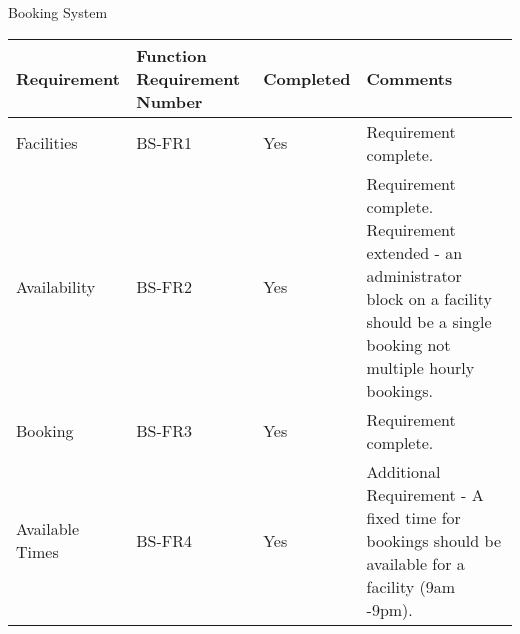 Booking System \\
\begin{center}
\begin{tabular}{ |l|l|l|l| }
\hline

Requirement &  Function Requirement Number 	& Completed 	& Comments	 \\
\hline
Facilities      									& BS-FR1	& Yes      		& Requirement complete. \\
Availability   										& BS-FR2	& Yes      		& Requirement complete. Requirement extended - an administrator block on a facility should be a single booking not multiple hourly bookings. 	\\
Booking         									& BS-FR3	& Yes      		& Requirement complete. \\
Available Times 									& BS-FR4	& Yes      		& Additional Requirement - A fixed time for bookings should be available for a facility (9am -9pm). \\

\hline
\end{tabular}
\end{center}

